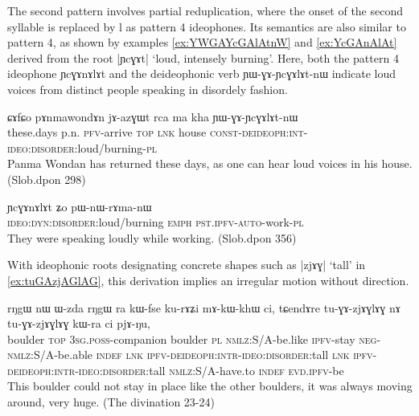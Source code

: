 \documentclass[oldfontcommands,oneside,a4paper,11pt]{article}
\newcommand{\ipa}[1]{{\phon \mbox{#1}}} %
\begin{document}
The second pattern involves partial reduplication, where the onset of the second syllable is replaced by \ipa{l} as pattern 4 ideophones. Its semantics are also similar to pattern 4, as shown by examples  \ref{ex:YWGAYcGAlAtnW} and \ref{ex:YcGAnAlAt} derived from the root |\ipa{ɲcɣɤt}| `loud, intensely burning'. Here, both the  pattern 4 ideophone \ipa{ɲcɣɤnɤlɤt}  and the deideophonic verb  \ipa{ɲɯ-ɣɤ-ɲcɣɤlɤt-nɯ} indicate loud voices from distinct people speaking in disordely fashion.

     \begin{exe}
\ex \label{ex:YWGAYcGAlAtnW}
\gll 
\ipa{ɕɤfɕo}  	\ipa{pɤnmawondɤn}  	\ipa{jɤ-azɣɯt}  	\ipa{rca}  	\ipa{ma}  	\ipa{kha}  	\ipa{ɲɯ-ɣɤ-ɲcɣɤlɤt-nɯ}  \\
these.days p.n. \textsc{pfv}-arrive \textsc{top} \textsc{lnk} house \textsc{const-deideoph:int-ideo:disorder:}loud/burning-\textsc{pl}\\
\glt Panma Wondan has returned these days, as one can hear loud voices in his house. (Slob.dpon 298)
\end{exe}

     \begin{exe}
\ex \label{ex:YcGAnAlAt}
\gll 
\ipa{ɲcɣɤnɤlɤt}  	\ipa{ʑo}  	\ipa{pɯ-nɯ-rɤma-nɯ}  \\
\textsc{ideo:dyn:disorder}:loud/burning \textsc{emph} \textsc{pst.ipfv-auto}-work-\textsc{pl} \\
\glt They were speaking loudly while working. (Slob.dpon 356)
\end{exe}

With ideophonic roots designating concrete shapes such as  |\ipa{zjɤɣ}| `tall' in \ref{ex:tuGAzjAGlAG}, this derivation  implies an irregular motion   without direction.  

     \begin{exe}
\ex \label{ex:tuGAzjAGlAG}
\gll 
\ipa{rŋgɯ}  	\ipa{nɯ}  	\ipa{ɯ-zda}  	\ipa{rŋgɯ}  	\ipa{ra}  	\ipa{kɯ-fse}  	\ipa{ku-rɤʑi}  	\ipa{mɤ-kɯ-khɯ}  	\ipa{ci,}  	\ipa{tɕendɤre}  	\ipa{tu-ɣɤ-zjɤɣlɤɣ}  	\ipa{nɤ}  	\ipa{tu-ɣɤ-zjɤɣlɤɣ}  	\ipa{kɯ-ra}  	\ipa{ci}  	\ipa{pjɤ-ŋu,}  	 \\
boulder \textsc{top} \textsc{3sg.poss}-companion boulder \textsc{pl} \textsc{nmlz}:S/A-be.like \textsc{ipfv}-stay \textsc{neg-nmlz}:S/A-be.able \textsc{indef} \textsc{lnk} \textsc{ipfv-deideoph:intr-ideo:disorder}:tall \textsc{lnk} \textsc{ipfv-deideoph:intr-ideo:disorder}:tall \textsc{nmlz}:S/A-have.to \textsc{indef} \textsc{evd.ipfv}-be \\
\glt This boulder could not stay in place like the other boulders, it was always moving around, very huge. (The divination 23-24)
\end{exe}
\end{document}

